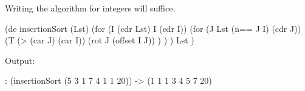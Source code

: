 \begin{itemize}
Writing the algorithm for integers will suffice.

\begin{wideverbatim}

(de insertionSort (Lst)
   (for (I (cdr Lst)  I  (cdr I))
      (for (J Lst  (n== J I)  (cdr J))
         (T (> (car J) (car I))
            (rot J (offset I J)) ) ) )
   Lst )

Output:

: (insertionSort (5 3 1 7 4 1 1 20))
-> (1 1 1 3 4 5 7 20)

\end{wideverbatim}








\end{itemize}
